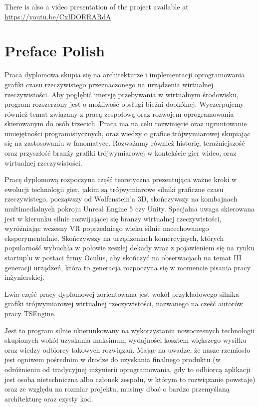 There is also a video presentation of the project available at \href{https://youtu.be/CxIDORRARdA}{https://youtu.be/CxIDORRARdA}

\newpage
\section{Preface Polish}
\hspace{\parindent}
Praca dyplomowa skupia się na architekturze i implementacji oprogramowania grafiki czasu rzeczywistego przeznaczonego na urządzenia wirtualnej rzeczywistości. Aby pogłębić imersję przebywania w wirtualnym środowisku, program rozszerzony jest o możliwość obsługi bieżni dookólnej. Wyczerpujemy również temat związany z pracą zespołową oraz rozwojem oprogramowania skierowanym do osób trzecich. Praca ma na celu rozwinięcie oraz ugruntowanie umiejętności programistycznych, oraz wiedzy o grafice trójwymiarowej skupiając się na zastosowaniu w fanomatyce. Rozważamy również historię, teraźniejszość oraz przyszłość branży grafiki trójwymiarowej w kontekście gier wideo, oraz wirtualnej rzeczywistości. 

Pracę dyplomową rozpoczyna część teoretyczna prezentująca ważne kroki w ewolucji technologii gier, jakim są trójwymiarowe silniki graficzne czasu rzeczywistego, począwszy od Wolfenstein’a 3D, skończywszy na kombajnach multimedialnych pokroju Unreal Engine 5 czy Unity. Specjalna uwaga skierowana jest w kierunku silnie rozwijającej się branży wirtualnej rzeczywistości, wyróżniając wczesny VR poprzedniego wieku silnie nacechowanego eksperymentalnie. Skończywszy na urządzeniach komercyjnych, których popularność wybuchła w połowie zeszłej dekady wraz z pojawieniem się na rynku startup’u w postaci firmy Oculus, aby skończyć na obserwacjach na temat III generacji urządzeń, która to generacja rozpoczyna się w momencie pisania pracy inżynierskiej. 
 

Lwia część pracy dyplomowej zorientowana jest wokół przykładowego silnika grafiki trójwymiarowej wirtualnej rzeczywistości, nazwanego na cześć autorów pracy TSEngine. 

Jest to program silnie ukierunkowany na wykorzystaniu nowoczesnych technologii skupionych wokół uzyskania maksimum wydajności kosztem większego wysiłku oraz wiedzy odbiorcy takowych rozwiązań. Mając na uwadze, że nasze rzemiosło jest ogniwem pośrednim w drodze do uzyskania finalnego produktu (w odróżnieniu od tradycyjnej inżynierii oprogramowania, gdy to odbiorcą aplikacji jest osoba nietechniczna albo członek zespołu, w którym to rozwiązanie powstaje) oraz ze względu na rozmiar projektu, musimy dbać o bardzo przemyślaną architekturę oraz czysty kod. 
 


